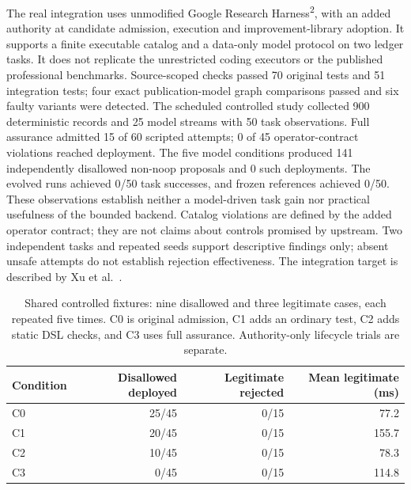 The real integration uses unmodified Google Research Harness\textsuperscript{2}, with an added authority at candidate admission, execution and improvement-library adoption. It supports a finite executable catalog and a data-only model protocol on two ledger tasks. It does not replicate the unrestricted coding executors or the published professional benchmarks. Source-scoped checks passed 70 original tests and 51 integration tests; four exact publication-model graph comparisons passed and six faulty variants were detected. The scheduled controlled study collected 900 deterministic records and 25 model streams with 50 task observations. Full assurance admitted 15 of 60 scripted attempts; 0 of 45 operator-contract violations reached deployment. The five model conditions produced 141 independently disallowed non-noop proposals and 0 such deployments. The evolved runs achieved 0/50 task successes, and frozen references achieved 0/50. These observations establish neither a model-driven task gain nor practical usefulness of the bounded backend. Catalog violations are defined by the added operator contract; they are not claims about controls promised by upstream. Two independent tasks and repeated seeds support descriptive findings only; absent unsafe attempts do not establish rejection effectiveness. The integration target is described by Xu et al.~\cite{xu2026harness2}.
\begin{table}
\centering\small
\begin{tabular}{lrrr}
Condition & Disallowed deployed & Legitimate rejected & Mean legitimate (ms) \\
\hline
C0 & 25/45 & 0/15 & 77.2 \\
C1 & 20/45 & 0/15 & 155.7 \\
C2 & 10/45 & 0/15 & 78.3 \\
C3 & 0/45 & 0/15 & 114.8 \\
\end{tabular}
\caption{Shared controlled fixtures: nine disallowed and three legitimate cases, each repeated five times. C0 is original admission, C1 adds an ordinary test, C2 adds static DSL checks, and C3 uses full assurance. Authority-only lifecycle trials are separate.}
\end{table}
